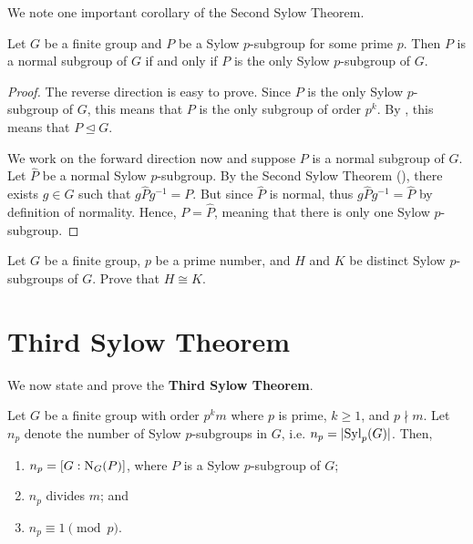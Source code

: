We note one important corollary of the Second Sylow Theorem.
\begin{corollary}\label{corollary-sylow-subgroup-is-normal-if-it-is-unique}
    Let $G$ be a finite group and $P$ be a Sylow $p$-subgroup for some prime $p$. Then $P$ is a normal subgroup of $G$ if and only if $P$ is the only Sylow $p$-subgroup of $G$.
\end{corollary}
\begin{proof}
    The reverse direction is easy to prove. Since $P$ is the only Sylow $p$-subgroup of $G$, this means that $P$ is the only subgroup of order $p^k$. By , this means that $P \unlhd G$.

    We work on the forward direction now and suppose $P$ is a normal subgroup of $G$. Let $\hat{P}$ be a normal Sylow $p$-subgroup. By the Second Sylow Theorem (), there exists $g \in G$ such that $g\hat{P}g^{-1} = P$. But since $\hat{P}$ is normal, thus $g\hat{P}g^{-1} = \hat{P}$ by definition of normality. Hence, $P = \hat{P}$, meaning that there is only one Sylow $p$-subgroup.
\end{proof}

\begin{exercise}
    Let $G$ be a finite group, $p$ be a prime number, and $H$ and $K$ be distinct Sylow $p$-subgroups of $G$. Prove that $H \cong K$.
\end{exercise}

\section{Third Sylow Theorem}
We now state and prove the \textbf{Third Sylow Theorem}.
\begin{theorem}\label{thrm-sylow-3}
    Let $G$ be a finite group with order $p^k m$ where $p$ is prime, $k \geq 1$, and $p \nmid m$. Let $n_p$ denote the number of Sylow $p$-subgroups in $G$, i.e. $n_p = |\mathrm{Syl}_{p}(G)|$. Then,
    \begin{enumerate}
        \item $n_p = [G:\mathrm{N}_{G}(P)]$, where $P$ is a Sylow $p$-subgroup of $G$;
        \item $n_p$ divides $m$; and
        \item $n_p \equiv 1 \pmod p$.
    \end{enumerate}
\end{theorem}

\newpage

